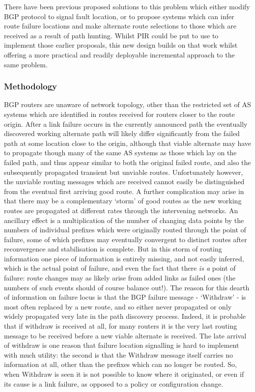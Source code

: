There have been previous proposed solutions to this problem which either modify BGP protocol to signal fault location, or to propose systems which can infer route failure locations and make alternate route selections to those which are received as a result of path hunting. Whilst PIR could be put to use to implement those earlier proposals, this new design builds on that work whilst offering a more practical and readily deployable incremental approach to the same problem.

\subsubsection*{Methodology}


BGP routers are unaware of network topology, other than the restricted set of AS systems which are identified in routes received for routers closer to the route origin. After a link failure occurs in the currently announced path the eventually discovered working alternate path will likely differ significantly from the failed path at some location close to the origin, although that viable alternate may have to propagate though many of the same AS systems as those which lay on the failed path, and thus appear similar to both the original failed route, and also the subsequently propagated transient but unviable routes. Unfortunately however, the unviable routing messages which are received cannot easily be distinguished from the eventual first arriving good route. A further complication may arise in that there may be a complementary ‘storm’ of good routes as the new working routes are propagated at different rates through the intervening networks. An ancillary effect is a multiplication of the number of changing data points by the numbers of individual prefixes which were originally routed through the point of failure, some of which prefixes may eventually convergent to distinct routes after reconvergence and stabilisation is complete. But in this storm of routing information one piece of information is entirely missing, and not easily inferred, which is the actual point of failure, and even the fact that there \textit{is a} point of failure: route changes may as likely arise from added links as failed ones (the numbers of such events should of course balance out!). The reason for this dearth of information on failure locus is that the BGP failure message - ‘Withdraw’ - is most often replaced by a new route, and so either never propagated or only widely propagated very late in the path discovery process. Indeed, it is probable that if withdraw is received at all, for many routers it is the very last routing message to be received before a new viable alternate is received. The late arrival of withdraw is one reason that failure location signalling is hard to implement with much utility: the second is that the Withdraw message itself carries no information at all, other than the prefixes which can no longer be routed. So, when Withdraw is seen it is not possible to know where it originated, or even if its cause is a link failure, as opposed to a policy or configuration change.


